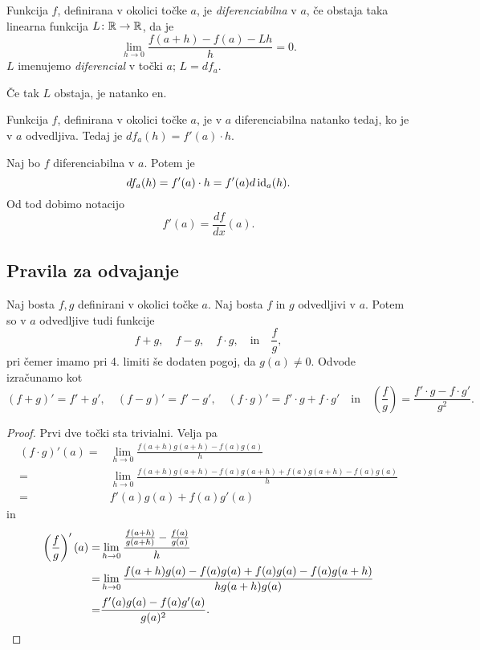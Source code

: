 \documentclass[12pt, a4paper]{article}
\begin{document}
\begin{definicija}
Funkcija $f$, definirana v okolici točke $a$, je \emph{diferenciabilna} v $a$, če obstaja taka linearna funkcija $L\colon\mathbb{R}\to\mathbb{R}$, da je
\[
\lim_{h\to 0}\frac{f(a+h)-f(a)-Lh}{h}=0.
\]
$L$ imenujemo \emph{diferencial} v točki $a$; $L=df_a$.
\end{definicija}

\begin{opomba}
Če tak $L$ obstaja, je natanko en.
\end{opomba}

\begin{trditev}
Funkcija $f$, definirana v okolici točke $a$, je v $a$ diferenciabilna natanko tedaj, ko je v $a$ odvedljiva. Tedaj je $df_a(h)=f'(a)\cdot h$.
\end{trditev}

\obvs

\begin{opomba}
Naj bo $f$ diferenciabilna v $a$. Potem je
\[
df_a(h)=f'(a)\cdot h=f'(a) d\operatorname{id}_a(h).
\]
Od tod dobimo notacijo
\[
f'(a)=\frac{df}{dx}(a).
\]
\end{opomba}

\newpage

\subsection{Pravila za odvajanje}

\begin{izrek}
Naj bosta $f,g$ definirani v okolici točke $a$. Naj bosta $f$ in $g$ odvedljivi v $a$. Potem so v $a$ odvedljive tudi funkcije
\[
f+g,\quad f-g,\quad f\cdot g,\quad\text{in}\quad \frac{f}{g},
\]
pri čemer imamo pri 4. limiti še dodaten pogoj, da $g(a)\ne 0$. Odvode izračunamo kot
\[
(f+g)'=f'+g',\quad (f-g)'=f'-g',\quad (f\cdot g)'=f'\cdot g+f\cdot g'\quad\text{in}\quad \left(\frac{f}{g}\right)=\frac{f'\cdot g-f\cdot g'}{g^2}.
\]
\end{izrek}

\begin{proof}
Prvi dve točki sta trivialni. Velja pa
\begin{align*}
(f\cdot g)'(a)=&\lim_{h\to 0}\frac{f(a+h)g(a+h)-f(a)g(a)}{h}
\\
=&\lim_{h\to 0}\frac{f(a+h)g(a+h)-f(a)g(a+h)+f(a)g(a+h)-f(a)g(a)}{h}
\\
=&f'(a)g(a)+f(a)g'(a)
\end{align*}
in
\begin{align*}
\left(\frac{f}{g}\right)'(a)=&\lim_{h\to 0}\frac{\frac{f(a+h)}{g(a+h)}-\frac{f(a)}{g(a)}}{h}
\\
=&\lim_{h\to 0}\frac{f(a+h)g(a)-f(a)g(a)+f(a)g(a)-f(a)g(a+h)}{hg(a+h)g(a)}
\\
=&\frac{f'(a)g(a)-f(a)g'(a)}{g(a)^2}.\qedhere
\end{align*}
\end{proof}
\end{document}
